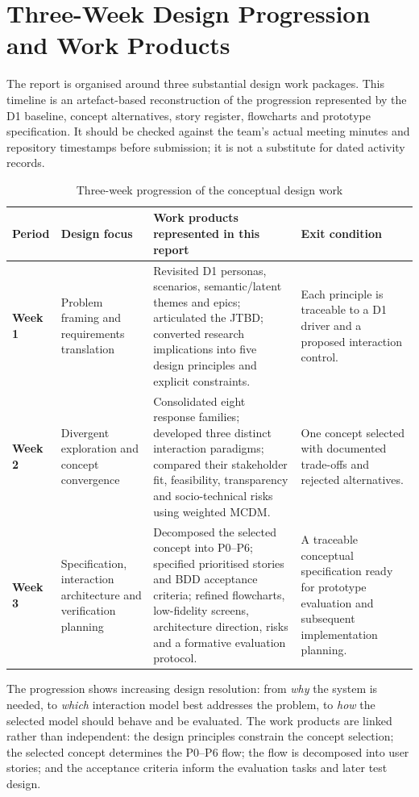 \documentclass[12pt,a4paper]{article}
\begin{document}
\section{Three-Week Design Progression and Work Products}

The report is organised around three substantial design work packages. This timeline is an artefact-based reconstruction of the progression represented by the D1 baseline, concept alternatives, story register, flowcharts and prototype specification. It should be checked against the team's actual meeting minutes and repository timestamps before submission; it is not a substitute for dated activity records.

\begin{table}[ht]
\centering
\small
\caption{Three-week progression of the conceptual design work}
\label{tab:three-week}
\begin{tabularx}{\textwidth}{@{}p{1.5cm}p{3.2cm}Xp{3.2cm}@{}}
\toprule
\textbf{Period} & \textbf{Design focus} & \textbf{Work products represented in this report} & \textbf{Exit condition}\\
\midrule
\textbf{Week 1} & Problem framing and requirements translation & Revisited D1 personas, scenarios, semantic/latent themes and epics; articulated the JTBD; converted research implications into five design principles and explicit constraints. & Each principle is traceable to a D1 driver and a proposed interaction control.\\
\rowcolor{brandlight}
\textbf{Week 2} & Divergent exploration and concept convergence & Consolidated eight response families; developed three distinct interaction paradigms; compared their stakeholder fit, feasibility, transparency and socio-technical risks using weighted MCDM. & One concept selected with documented trade-offs and rejected alternatives.\\
\textbf{Week 3} & Specification, interaction architecture and verification planning & Decomposed the selected concept into P0--P6; specified prioritised stories and BDD acceptance criteria; refined flowcharts, low-fidelity screens, architecture direction, risks and a formative evaluation protocol. & A traceable conceptual specification ready for prototype evaluation and subsequent implementation planning.\\
\bottomrule
\end{tabularx}
\end{table}

The progression shows increasing design resolution: from \emph{why} the system is needed, to \emph{which} interaction model best addresses the problem, to \emph{how} the selected model should behave and be evaluated. The work products are linked rather than independent: the design principles constrain the concept selection; the selected concept determines the P0--P6 flow; the flow is decomposed into user stories; and the acceptance criteria inform the evaluation tasks and later test design.
\end{document}
